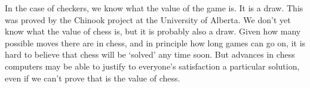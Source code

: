 In the case of checkers, we know what the value of the game is. It is a draw. This was proved by the Chinook project at the University of Alberta. We don't yet know what the value of chess is, but it is probably also a draw. Given how many possible moves there are in chess, and in principle how long games can go on, it is hard to believe that chess will be `solved' any time soon. But advances in chess computers may be able to justify to everyone's satisfaction a particular solution, even if we can't prove that is the value of chess.
